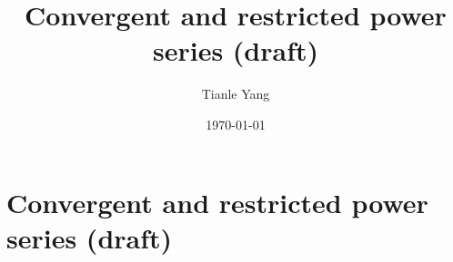 \documentclass{noteformyself}
\title{Convergent and restricted power series (draft)}
\author{Tianle Yang}
\date{\today}
\begin{document}
    \maketitle

    \section{Convergent and restricted power series (draft)}



\end{document}
